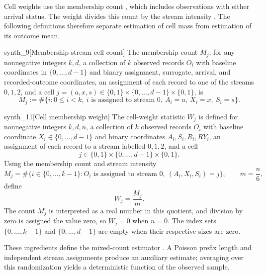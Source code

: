 Cell weights use the membership count , which includes observations with either arrival status. The weight  divides this count by the stream intensity . The following definitions therefore separate estimation of cell mass from estimation of its outcome mean.

\begin{definitionv}{synth_9}[Membership stream cell count]
The membership count \(M_j\), for any nonnegative integers \(k,d\), a collection of \(k\) observed records \(O_i\) with baseline coordinates in \(\{0,\ldots,d-1\}\) and binary assignment, surrogate, arrival, and recorded-outcome coordinates, an assignment of each record to one of the streams \(0,1,2\), and a cell \(j=(a,x,s)\in\{0,1\}\times\{0,\ldots,d-1\}\times\{0,1\}\), is
\[
M_j
:=
\#\bigl\{i:0\le i<k,\ 
i\text{ is assigned to stream }0,\ 
A_i=a,\ X_i=x,\ S_i=s\bigr\}.
\]
\end{definitionv}

\begin{definitionv}{synth_11}[Cell membership weight]
The cell-weight statistic \(W_j\) is defined for nonnegative integers \(k,d,n\), a collection of \(k\) observed records \(O_i\) with baseline coordinate \(X_i\in\{0,\ldots,d-1\}\) and binary coordinates \(A_i,S_i,R_i,RY_i\), an assignment of each record to a stream labelled \(0,1,2\), and a cell
\[
j\in\{0,1\}\times\{0,\ldots,d-1\}\times\{0,1\}.
\]
Using the membership count and stream intensity
\[
M_j=\#\{i\in\{0,\ldots,k-1\}: O_i\text{ is assigned to stream }0,\ (A_i,X_i,S_i)=j\},
\qquad
m=\frac{n}{6},
\]
define
\[
W_j=\frac{M_j}{m}.
\]
The count \(M_j\) is interpreted as a real number in this quotient, and division by zero is assigned the value zero, so \(W_j=0\) when \(n=0\). The index sets \(\{0,\ldots,k-1\}\) and \(\{0,\ldots,d-1\}\) are empty when their respective sizes are zero.
\end{definitionv}

These ingredients define the mixed-count estimator . A Poisson prefix length  and independent stream assignments produce an auxiliary estimate; averaging over this randomization yields a deterministic function of the observed sample.

